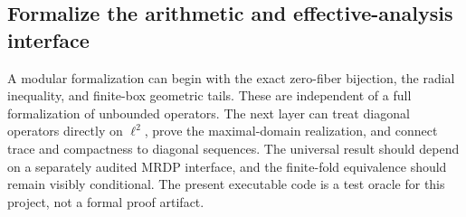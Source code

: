 \documentclass[11pt,letterpaper]{article}
\theoremstyle{definition}
\theoremstyle{remark}
\begin{document}
\subsection{Formalize the arithmetic and effective-analysis interface}\label{ste:ta:q:formalize}
A modular formalization can begin with the exact zero-fiber bijection, the radial inequality, and finite-box geometric tails. These are independent of a full formalization of unbounded operators. The next layer can treat diagonal operators directly on $\ell^2$, prove the maximal-domain realization, and connect trace and compactness to diagonal sequences. The universal result should depend on a separately audited MRDP interface, and the finite-fold equivalence should remain visibly conditional. The present executable code is a test oracle for this project, not a formal proof artifact.
\end{document}
